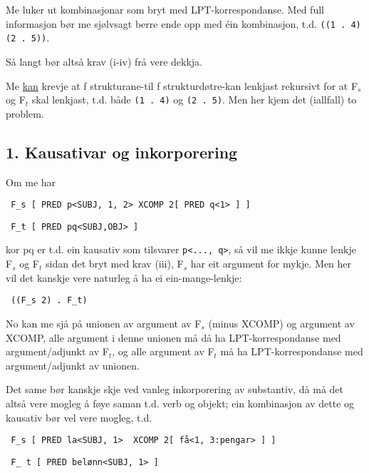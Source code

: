 \documentclass[11pt,a4paper,oneside,draft]{book}
\begin{document}
Me luker ut kombinasjonar som bryt med LPT-korrespondanse. Med full
informasjon bør me sjølvsagt berre ende opp med éin kombinasjon,
t.d. \texttt{((1 . 4) (2 . 5))}.

Så langt bør altså krav (i-iv) frå \citet{dyvik2009lmp} vere dekkja.

Me \underline{kan} krevje at f strukturane-til f strukturdøtre-kan lenkjast
rekursivt for at F$_s$ og F$_t$ skal lenkjast, t.d. både \texttt{(1 . 4)} og \texttt{(2 . 5)}. Men her kjem det (iallfall) to problem.


\subsection{1. Kausativar og inkorporering}
\label{sec-3.8.1}

Om me har 

\begin{verbatim}
 F_s [ PRED p<SUBJ, 1, 2> XCOMP 2[ PRED q<1> ] ]
\end{verbatim}


\begin{verbatim}
 F_t [ PRED pq<SUBJ,OBJ> ]
\end{verbatim}


kor pq er t.d. ein kausativ som tilsvarer \texttt{p<..., q>}, så vil me ikkje
kunne lenkje F$_s$ og F$_t$ sidan det bryt med krav (iii), F$_s$ har eit
argument for mykje. Men her vil det kanskje vere naturleg å ha ei
ein-mange-lenkje:

\begin{verbatim}
 ((F_s 2) . F_t)
\end{verbatim}


No kan me sjå på unionen av argument av F$_s$ (minus XCOMP) og argument
av XCOMP, alle argument i denne unionen må då ha LPT-korrespondanse
med argument/adjunkt av F$_t$, og alle argument av F$_t$ må ha
LPT-korrespondanse med argument/adjunkt av unionen.

Det same bør kanskje skje ved vanleg inkorporering av substantiv, då
må det altså vere mogleg å føye saman t.d. verb og objekt; ein
kombinasjon av dette og kausativ bør vel vere mogleg, t.d.

\begin{verbatim}
 F_s [ PRED la<SUBJ, 1>  XCOMP 2[ få<1, 3:pengar> ] ]
\end{verbatim}


\begin{verbatim}
 F_ t [ PRED belønn<SUBJ, 1> ]
\end{verbatim}
\end{document}
